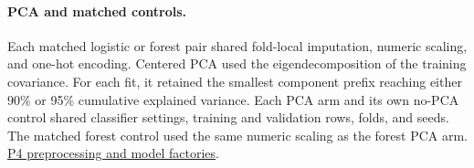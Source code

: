 \documentclass{article}
\begin{document}
\paragraph{PCA and matched controls.}
Each matched logistic or forest pair shared fold-local imputation, numeric
scaling, and one-hot encoding. Centered PCA used the eigendecomposition of
the training covariance. For each fit, it retained the smallest component
prefix reaching either 90\% or 95\% cumulative explained variance. Each
PCA arm and its own no-PCA control shared classifier settings, training and
validation rows, folds, and seeds. The matched forest control used the same
numeric scaling as the forest PCA arm.
\href{https://github.com/oki-dokii/Flight-Departure-Delay-Prediction-/blob/0c419696e29dfe90be903ddb77c2a51028be41e1/src/models_classical.py}{P4 preprocessing and model factories}.
\end{document}

